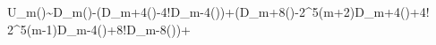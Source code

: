 U_{m}(\xi)\sim D_{m}\left(\xi\right)-\left(D_{m+4}\left(\xi\right)-4!D_{m-4}\left(\xi\right)\right)+\left(D_{m+8}\left(\xi\right)-2^{5}(m+2)D_{m+4}\left(\xi\right)+4!\,2^{5}(m-1)D_{m-4}\left(\xi\right)+8!D_{m-8}\left(\xi\right)\right)+\cdots